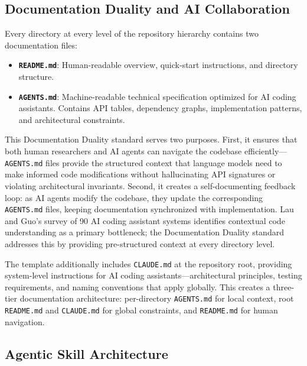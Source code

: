 \documentclass[
]{article}
\providecommand{\tightlist}{%
  \setlength{\itemsep}{0pt}\setlength{\parskip}{0pt}}
\begin{document}
\newpage

\subsection{Documentation Duality and AI
Collaboration}\label{documentation-duality-and-ai-collaboration}

Every directory at every level of the repository hierarchy contains two
documentation files:

\begin{itemize}
\tightlist
\item
  \textbf{\texttt{README.md}}: Human-readable overview, quick-start
  instructions, and directory structure.
\item
  \textbf{\texttt{AGENTS.md}}: Machine-readable technical specification
  optimized for AI coding assistants. Contains API tables, dependency
  graphs, implementation patterns, and architectural constraints.
\end{itemize}

This Documentation Duality standard serves two purposes. First, it
ensures that both human researchers and AI agents can navigate the
codebase efficiently---\texttt{AGENTS.md} files provide the structured
context that language models need to make informed code modifications
without hallucinating API signatures or violating architectural
invariants. Second, it creates a self-documenting feedback loop: as AI
agents modify the codebase, they update the corresponding
\texttt{AGENTS.md} files, keeping documentation synchronized with
implementation. Lau and Guo's survey of 90 AI coding assistant systems
\citep{lau2025aicoding} identifies contextual code understanding as a
primary bottleneck; the Documentation Duality standard addresses this by
providing pre-structured context at every directory level.

The template additionally includes \texttt{CLAUDE.md} at the repository
root, providing system-level instructions for AI coding
assistants---architectural principles, testing requirements, and naming
conventions that apply globally. This creates a three-tier documentation
architecture: per-directory \texttt{AGENTS.md} for local context, root
\texttt{README.md} and \texttt{CLAUDE.md} for global constraints, and
\texttt{README.md} for human navigation.

\subsection{Agentic Skill
Architecture}\label{agentic-skill-architecture}
\end{document}

